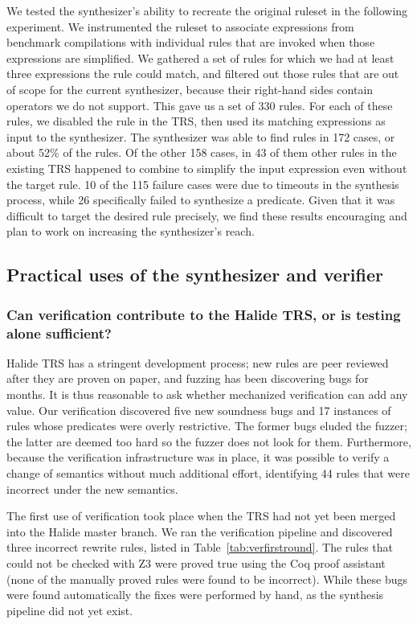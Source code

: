 \documentclass[acmsmall,review,anonymous]{acmart}\settopmatter{printfolios=true,printccs=false,printacmref=false}
\begin{document}
We tested the synthesizer's ability to recreate the original ruleset in the following experiment. We instrumented the ruleset to associate expressions from benchmark compilations with individual rules that are invoked when those expressions are simplified. We gathered a set of rules for which we had at least three expressions the rule could match, and filtered out those rules that are out of scope for the current synthesizer, because their right-hand sides contain operators we do not support. This gave us a set of 330 rules. For each of these rules, we disabled the rule in the TRS, then used its matching expressions as input to the synthesizer. The synthesizer was able to find rules in 172 cases, or about 52\% of the rules. Of the other 158 cases, in 43 of them other rules in the existing TRS happened to combine to simplify the input expression even without the target rule. 10 of the 115 failure cases were due to timeouts in the synthesis process, while 26 specifically failed to synthesize a predicate. Given that it was difficult to target the desired rule precisely, we find these results encouraging and plan to work on increasing the synthesizer's reach.

\subsection{Practical uses of the synthesizer and verifier}

\subsubsection{Can verification contribute to the Halide TRS, or is testing alone sufficient?}
\label{sec:eval-correctness}

Halide TRS has a stringent development process; new rules are peer reviewed after they are proven on paper, and fuzzing has been discovering bugs for months. It is thus reasonable to ask whether mechanized verification can add any value. Our verification discovered five new soundness bugs and 17 instances of rules whose predicates were overly restrictive. The former bugs eluded the fuzzer; the latter are deemed too hard so the fuzzer does not look for them. Furthermore, because the verification infrastructure was in place, it was possible to verify a change of semantics without much additional effort, identifying 44 rules that were incorrect under the new semantics.

The first use of verification took place when the TRS had not yet been merged into the Halide master branch. We ran the verification pipeline and discovered three incorrect rewrite rules, listed in Table~\ref{tab:verfirstround}. The rules that could not be checked with Z3 were proved true using the Coq proof assistant (none of the manually proved rules were found to be incorrect). While these bugs were found automatically the fixes were performed by hand, as the synthesis pipeline did not yet exist. 
\end{document}
